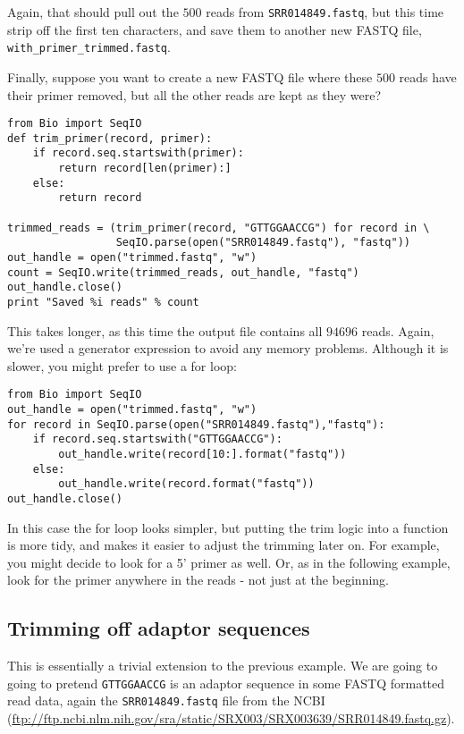 \documentclass{report}
\begin{document}
\noindent Again, that should pull out the $500$ reads from \texttt{SRR014849.fastq},
but this time strip off the first ten characters, and save them to another new
FASTQ file, \texttt{with\_primer\_trimmed.fastq}.

Finally, suppose you want to create a new FASTQ file where these $500$ reads have
their primer removed, but all the other reads are kept as they were?

\begin{verbatim}
from Bio import SeqIO
def trim_primer(record, primer):
    if record.seq.startswith(primer):
        return record[len(primer):]
    else:
        return record

trimmed_reads = (trim_primer(record, "GTTGGAACCG") for record in \
                 SeqIO.parse(open("SRR014849.fastq"), "fastq"))
out_handle = open("trimmed.fastq", "w")
count = SeqIO.write(trimmed_reads, out_handle, "fastq")
out_handle.close()
print "Saved %i reads" % count
\end{verbatim}

This takes longer, as this time the output file contains all $94696$ reads.
Again, we're used a generator expression to avoid any memory problems.
Although it is slower, you might prefer to use a for loop:

\begin{verbatim}
from Bio import SeqIO
out_handle = open("trimmed.fastq", "w")
for record in SeqIO.parse(open("SRR014849.fastq"),"fastq"):
    if record.seq.startswith("GTTGGAACCG"):
        out_handle.write(record[10:].format("fastq"))
    else:
        out_handle.write(record.format("fastq"))
out_handle.close()
\end{verbatim}

In this case the for loop looks simpler, but putting the trim logic into a
function is more tidy, and makes it easier to adjust the trimming later on.
For example, you might decide to look for a 5' primer as well. Or, as in
the following example, look for the primer anywhere in the reads - not
just at the beginning.

\subsection{Trimming off adaptor sequences}
\label{sec:FASTQ-slicing-off-adaptor}

This is essentially a trivial extension to the previous example. We are going
to going to pretend \texttt{GTTGGAACCG} is an adaptor sequence in some FASTQ
formatted read data, again the \texttt{SRR014849.fastq} file from the NCBI
(\url{ftp://ftp.ncbi.nlm.nih.gov/sra/static/SRX003/SRX003639/SRR014849.fastq.gz}).
\end{document}
